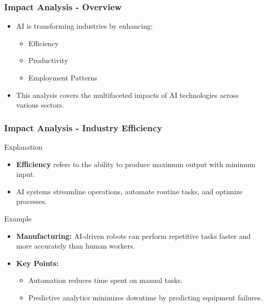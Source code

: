 \documentclass{beamer}
\begin{document}
\begin{frame}[fragile]
    \frametitle{Impact Analysis - Overview}
    \begin{itemize}
        \item AI is transforming industries by enhancing:
        \begin{itemize}
            \item Efficiency
            \item Productivity
            \item Employment Patterns
        \end{itemize}
        \item This analysis covers the multifaceted impacts of AI technologies across various sectors.
    \end{itemize}
\end{frame}

\begin{frame}[fragile]
    \frametitle{Impact Analysis - Industry Efficiency}
    \begin{block}{Explanation}
        \begin{itemize}
            \item \textbf{Efficiency} refers to the ability to produce maximum output with minimum input. 
            \item AI systems streamline operations, automate routine tasks, and optimize processes.
        \end{itemize}
    \end{block}
    
    \begin{block}{Example}
        \begin{itemize}
            \item \textbf{Manufacturing:} AI-driven robots can perform repetitive tasks faster and more accurately than human workers.
        \end{itemize}
    \end{block}
    
    \begin{itemize}
        \item \textbf{Key Points:}
        \begin{itemize}
            \item Automation reduces time spent on manual tasks.
            \item Predictive analytics minimizes downtime by predicting equipment failures.
        \end{itemize}
    \end{itemize}
\end{frame}
\end{document}
